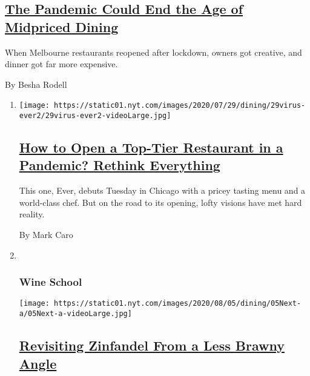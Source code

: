 \begin{enumerate}
\begin{enumerate}
{    \subsection{\texorpdfstring{\href{/2020/07/28/dining/melbourne-restaurants-coronavirus.html}{The
    Pandemic Could End the Age of Midpriced
    Dining}}{The Pandemic Could End the Age of Midpriced Dining}}\label{the-pandemic-could-end-the-age-of-midpriced-dining}}

    When Melbourne restaurants reopened after lockdown, owners got
    creative, and dinner got far more expensive.

    By Besha Rodell
  \end{enumerate}
\end{enumerate}

\begin{enumerate}
\def\labelenumi{\arabic{enumi}.}
\item
  \texttt{[image: https://static01.nyt.com/images/2020/07/29/dining/29virus-ever2/29virus-ever2-videoLarge.jpg]}

  \hypertarget{how-to-open-a-top-tier-restaurant-in-a-pandemic-rethink-everything}{%
  \subsection{\texorpdfstring{\href{/2020/07/28/dining/ever-chicago-restaurant-coronavirus.html}{How
  to Open a Top-Tier Restaurant in a Pandemic? Rethink
  Everything}}{How to Open a Top-Tier Restaurant in a Pandemic? Rethink Everything}}\label{how-to-open-a-top-tier-restaurant-in-a-pandemic-rethink-everything}}

  This one, Ever, debuts Tuesday in Chicago with a pricey tasting menu
  and a world-class chef. But on the road to its opening, lofty visions
  have met hard reality.

  By Mark Caro
\item ~
  \hypertarget{wine-school-1}{%
  \subsubsection{Wine School}\label{wine-school-1}}

  \texttt{[image: https://static01.nyt.com/images/2020/08/05/dining/05Next-a/05Next-a-videoLarge.jpg]}

  \hypertarget{revisiting-zinfandel-from-a-less-brawny-angle}{%
  \subsection{\texorpdfstring{\href{/2020/07/30/dining/drinks/wine-school-assignment-zinfandel.html}{Revisiting
  Zinfandel From a Less Brawny
  Angle}}{Revisiting Zinfandel From a Less Brawny Angle}}\label{revisiting-zinfandel-from-a-less-brawny-angle}}


\end{enumerate}

